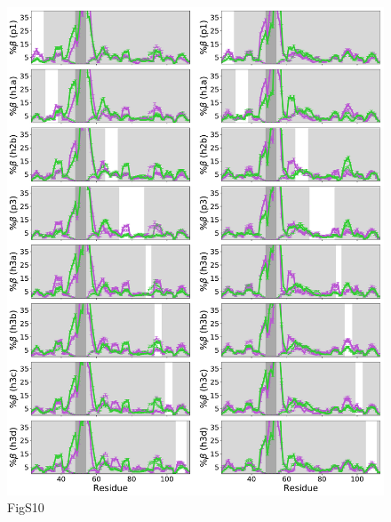 \documentclass[10pt,letterpaper]{article}
\begin{document}
\begin{figure}[!ht]
\includegraphics[scale=0.5,width=\textwidth,trim={0 0cm 0 0cm},clip]{./figures/S10.pdf}
\caption{{FigS10}}
\end{figure}
\end{document}
